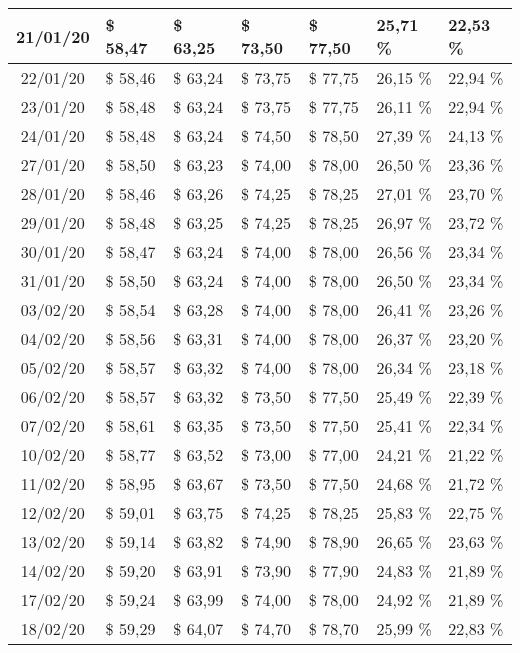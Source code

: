 \begin{center}
\begin{longtable}{|c|p{1.5cm}|p{1.5cm}|p{1.5cm}|p{1.5cm}|p{1.5cm}|p{1.5cm}|}
21/01/20 & \$ 58,47 & \$ 63,25 & \$ 73,50 & \$ 77,50 & 25,71 \% & 22,53 \% \\ \hline
22/01/20 & \$ 58,46 & \$ 63,24 & \$ 73,75 & \$ 77,75 & 26,15 \% & 22,94 \% \\ \hline
23/01/20 & \$ 58,48 & \$ 63,24 & \$ 73,75 & \$ 77,75 & 26,11 \% & 22,94 \% \\ \hline
24/01/20 & \$ 58,48 & \$ 63,24 & \$ 74,50 & \$ 78,50 & 27,39 \% & 24,13 \% \\ \hline
27/01/20 & \$ 58,50 & \$ 63,23 & \$ 74,00 & \$ 78,00 & 26,50 \% & 23,36 \% \\ \hline
28/01/20 & \$ 58,46 & \$ 63,26 & \$ 74,25 & \$ 78,25 & 27,01 \% & 23,70 \% \\ \hline
29/01/20 & \$ 58,48 & \$ 63,25 & \$ 74,25 & \$ 78,25 & 26,97 \% & 23,72 \% \\ \hline
30/01/20 & \$ 58,47 & \$ 63,24 & \$ 74,00 & \$ 78,00 & 26,56 \% & 23,34 \% \\ \hline
31/01/20 & \$ 58,50 & \$ 63,24 & \$ 74,00 & \$ 78,00 & 26,50 \% & 23,34 \% \\ \hline
03/02/20 & \$ 58,54 & \$ 63,28 & \$ 74,00 & \$ 78,00 & 26,41 \% & 23,26 \% \\ \hline
04/02/20 & \$ 58,56 & \$ 63,31 & \$ 74,00 & \$ 78,00 & 26,37 \% & 23,20 \% \\ \hline
05/02/20 & \$ 58,57 & \$ 63,32 & \$ 74,00 & \$ 78,00 & 26,34 \% & 23,18 \% \\ \hline
06/02/20 & \$ 58,57 & \$ 63,32 & \$ 73,50 & \$ 77,50 & 25,49 \% & 22,39 \% \\ \hline
07/02/20 & \$ 58,61 & \$ 63,35 & \$ 73,50 & \$ 77,50 & 25,41 \% & 22,34 \% \\ \hline
10/02/20 & \$ 58,77 & \$ 63,52 & \$ 73,00 & \$ 77,00 & 24,21 \% & 21,22 \% \\ \hline
11/02/20 & \$ 58,95 & \$ 63,67 & \$ 73,50 & \$ 77,50 & 24,68 \% & 21,72 \% \\ \hline
12/02/20 & \$ 59,01 & \$ 63,75 & \$ 74,25 & \$ 78,25 & 25,83 \% & 22,75 \% \\ \hline
13/02/20 & \$ 59,14 & \$ 63,82 & \$ 74,90 & \$ 78,90 & 26,65 \% & 23,63 \% \\ \hline
14/02/20 & \$ 59,20 & \$ 63,91 & \$ 73,90 & \$ 77,90 & 24,83 \% & 21,89 \% \\ \hline
17/02/20 & \$ 59,24 & \$ 63,99 & \$ 74,00 & \$ 78,00 & 24,92 \% & 21,89 \% \\ \hline
18/02/20 & \$ 59,29 & \$ 64,07 & \$ 74,70 & \$ 78,70 & 25,99 \% & 22,83 \% \\ \hline

\end{longtable}
\end{center}
